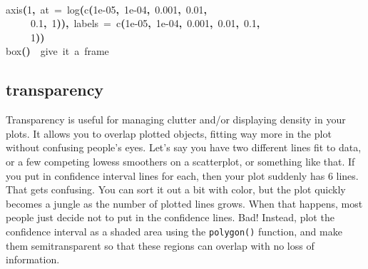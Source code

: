 \documentclass[a4paper]{article}
\newcommand{\hlnumber}[1]{\textcolor[rgb]{0.0823529411764706,0.0784313725490196,0.709803921568627}{#1}}%
\newcommand{\hlfunctioncall}[1]{\textcolor[rgb]{1,0,0}{#1}}%
\newcommand{\hlkeyword}[1]{\textcolor[rgb]{0,0,0}{\textbf{#1}}}%
\newcommand{\hlargument}[1]{\textcolor[rgb]{0.694117647058824,0.247058823529412,0.0196078431372549}{#1}}%
\newcommand{\hlcomment}[1]{\textcolor[rgb]{0.8,0.8,0.8}{#1}}%
\newcommand{\hlprompt}[1]{\textcolor[rgb]{0,0,0}{#1}}%
\newcommand{\hlstd}[1]{\textcolor[rgb]{0,0,0}{#1}}%
\newenvironment{Houtput}{\raggedright}{%
%
}
\begin{document}
\begin{Houtput}
\normalfont
\hspace*{\fill}\\
\hlstd{}\ttfamily\noindent
\hlprompt{\usebox{\hlnormalsizeboxgreaterthan}{\ }}\hlfunctioncall{axis}\hlkeyword{(}\hlnumber{1}\hlkeyword{,}{\ }\hlargument{at}{\ }\hlargument{=}{\ }\hlfunctioncall{log}\hlkeyword{(}\hlfunctioncall{c}\hlkeyword{(}\hlnumber{1e-05}\hlkeyword{,}{\ }\hlnumber{1e-04}\hlkeyword{,}{\ }\hlnumber{0.001}\hlkeyword{,}{\ }\hlnumber{0.01}\hlkeyword{,}\hspace*{\fill}\\
\hlstd{}\hlprompt{{\ }}{\ }{\ }{\ }{\ }\hlnumber{0.1}\hlkeyword{,}{\ }\hlnumber{1}\hlkeyword{)}\hlkeyword{)}\hlkeyword{,}{\ }\hlargument{labels}{\ }\hlargument{=}{\ }\hlfunctioncall{c}\hlkeyword{(}\hlnumber{1e-05}\hlkeyword{,}{\ }\hlnumber{1e-04}\hlkeyword{,}{\ }\hlnumber{0.001}\hlkeyword{,}{\ }\hlnumber{0.01}\hlkeyword{,}{\ }\hlnumber{0.1}\hlkeyword{,}\hspace*{\fill}\\
\hlstd{}\hlprompt{{\ }}{\ }{\ }{\ }{\ }\hlnumber{1}\hlkeyword{)}\hlkeyword{)}\mbox{}
\normalfont
\hspace*{\fill}\\
\hlstd{}\ttfamily\noindent
\hlprompt{\usebox{\hlnormalsizeboxgreaterthan}{\ }}\hlfunctioncall{box}\hlkeyword{(}\hlkeyword{)}{\ }{\ }\hlcomment{\usebox{\hlnormalsizeboxhash}{\ }give{\ }it{\ }a{\ }frame}\mbox{}
\normalfont
\hspace*{\fill}\\
\hlstd{}
\end{Houtput}
{\tikzexternaldisable

}
\subsection{transparency}
Transparency is useful for managing clutter and/or displaying density in your plots. It allows you to overlap plotted objects, fitting way more in the plot without confusing people's eyes. Let's say you have two different lines fit to data, or a few competing lowess smoothers on a scatterplot, or something like that. If you put in confidence interval lines for each, then your plot suddenly has 6 lines. That gets confusing. You can sort it out a bit with color, but the plot quickly becomes a jungle as the number of plotted lines grows. When that happens, most people just decide not to put in the confidence lines. Bad! Instead, plot the confidence interval as a shaded area using the \texttt{polygon()} function, and make them semitransparent so that these regions can overlap with no loss of information.\\
\end{document}
